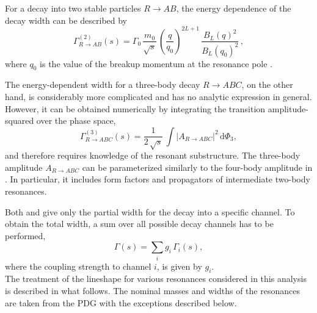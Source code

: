 For a decay into two stable particles $R \to AB$, the energy dependence of the decay width can be described by 
\begin{equation}
	\Gamma_{R \to AB}^{(2)}(s) = \Gamma_{0} \, \frac{m_{0}}{\sqrt s} \, \left(\frac{q}{q_{0}}\right)^{2L+1} \, \frac{B_{L}(q)^{2}}{B_{L}(q_{0})^{2}}  \, ,
	\label{eq:gamma2}
\end{equation}
where $q_{0}$ is the value of the breakup momentum at the resonance pole \cite{BW}.

The energy-dependent width for a three-body decay $R \to ABC$, on the other hand, is considerably more complicated and has no
analytic expression in general. However, it 
can be obtained numerically by integrating the transition amplitude-squared over the phase space,
\begin{equation}
	\Gamma_{R \to ABC}^{(3)}(s) =  \frac{1}{2 \, \sqrt s} \, \int \vert A_{R \to ABC} \vert^{2} \, \text{d}\Phi_{3}   ,
	\label{eq:gamma3}
\end{equation}
and therefore requires knowledge of the resonant substructure. 
The three-body amplitude $A_{R \to ABC}$ can be parameterized 
similarly to
the four-body amplitude in .
In particular, it includes form factors and propagators of intermediate two-body resonances.

Both  and  give only the partial width for the decay into a specific channel.
To obtain the total width, a sum over all possible decay channels has to be performed,
\begin{equation}
	\Gamma(s) = \sum_{i} g_{i} \, \Gamma_{i}(s) ,
\end{equation}
where the coupling strength to channel $i$, is given by $g_{i}$.
\newline
\\
\noindent The treatment of the lineshape for various resonances considered in this analysis is described in what follows.
The nominal masses and widths of the resonances are taken from the PDG \cite{PDG2016} with the exceptions described below.


